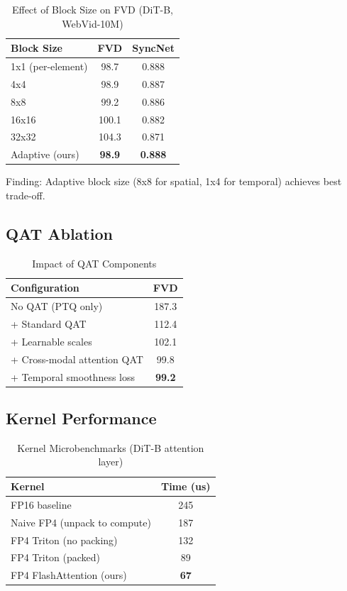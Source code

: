 \documentclass[journal]{IEEEtran}
\theoremstyle{definition}
\theoremstyle{remark}
\begin{document}
\begin{table}[h]
\centering
\caption{Effect of Block Size on FVD (DiT-B, WebVid-10M)}
\label{tab:block_size}
\begin{tabular}{lcc}
\toprule
Block Size & FVD & SyncNet \\
\midrule
1x1 (per-element) & 98.7 & 0.888 \\
4x4 & 98.9 & 0.887 \\
8x8 & 99.2 & 0.886 \\
16x16 & 100.1 & 0.882 \\
32x32 & 104.3 & 0.871 \\
Adaptive (ours) & \textbf{98.9} & \textbf{0.888} \\
\bottomrule
\end{tabular}
\end{table}

Finding: Adaptive block size (8x8 for spatial, 1x4 for temporal) achieves best trade-off.

\subsection{QAT Ablation}

\begin{table}[h]
\centering
\caption{Impact of QAT Components}
\label{tab:qat_ablation}
\begin{tabular}{lc}
\toprule
Configuration & FVD \\
\midrule
No QAT (PTQ only) & 187.3 \\
+ Standard QAT & 112.4 \\
+ Learnable scales & 102.1 \\
+ Cross-modal attention QAT & 99.8 \\
+ Temporal smoothness loss & \textbf{99.2} \\
\bottomrule
\end{tabular}
\end{table}

\subsection{Kernel Performance}

\begin{table}[h]
\centering
\caption{Kernel Microbenchmarks (DiT-B attention layer)}
\label{tab:kernels}
\begin{tabular}{lc}
\toprule
Kernel & Time (us) \\
\midrule
FP16 baseline & 245 \\
Naive FP4 (unpack to compute) & 187 \\
FP4 Triton (no packing) & 132 \\
FP4 Triton (packed) & 89 \\
FP4 FlashAttention (ours) & \textbf{67} \\
\bottomrule
\end{tabular}
\end{table}
\end{document}
